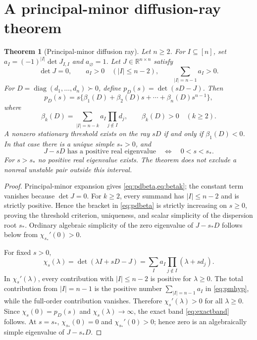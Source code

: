 \documentclass[11pt]{article}
\newtheorem{theorem}{Theorem}[section]
\theoremstyle{definition}
\newcommand{\R}{\mathbb R}
\newcommand{\diag}{\operatorname{diag}}
\newcommand{\1}{\mathbf 1}
\begin{document}
\section{A principal-minor diffusion-ray theorem}

\begin{theorem}[Principal-minor diffusion ray]\label{thm:diffusionray}
Let $n\ge2$.  For $I\subseteq[n]$, set
$a_I=(-1)^{|I|}\det J_{I,I}$ and
$a_\varnothing=1$.  Let $J\in\R^{n\times n}$ satisfy
\begin{equation}\label{eq:pmhyp}
 \det J=0,\qquad a_I>0\quad(|I|\le n-2),\qquad
 \sum_{|I|=n-1}a_I>0.
\end{equation}
For $D=\diag(d_1,\ldots,d_n)\succ0$, define $p_D(s)=\det(sD-J)$.  Then
\begin{equation}\label{eq:pdbeta}
 p_D(s)=s\{\beta_1(D)+\beta_2(D)s+\cdots+\beta_n(D)s^{n-1}\},
\end{equation}
where
\begin{equation}\label{eq:betak}
 \beta_k(D)=\sum_{|I|=n-k}a_I\prod_{j\notin I}d_j,
 \qquad \beta_k(D)>0\quad(k\ge2).
\end{equation}
A nonzero stationary threshold exists on the ray $sD$ if and only if
$\beta_1(D)<0$.  In that case there is a unique simple $s_*>0$, and
\begin{equation}\label{eq:exactband}
 J-sD\text{ has a positive real eigenvalue}
 \quad\Longleftrightarrow\quad 0<s<s_*.
\end{equation}
For $s>s_*$ no positive real eigenvalue exists.  The theorem does not exclude
a nonreal unstable pair outside this interval.
\end{theorem}

\begin{proof}
Principal-minor expansion gives \cref{eq:pdbeta,eq:betak}; the constant term
vanishes because $\det J=0$.  For $k\ge2$, every summand has
$|I|\le n-2$ and is strictly positive.  Hence the bracket in
\eqref{eq:pdbeta} is strictly increasing on $s\ge0$, proving the threshold
criterion, uniqueness, and scalar simplicity of the dispersion root $s_*$.  Ordinary
algebraic simplicity of the zero eigenvalue of $J-s_*D$ follows below from
$\chi_{s_*}'(0)>0$.

For fixed $s>0$,
\begin{equation}\label{eq:chis}
 \chi_s(\lambda)=\det(\lambda I+sD-J)
 =\sum_Ia_I\prod_{j\notin I}(\lambda+sd_j).
\end{equation}
In $\chi_s'(\lambda)$, every contribution with $|I|\le n-2$ is positive for
$\lambda\ge0$.  The total contribution from $|I|=n-1$ is the positive number
$\sum_{|I|=n-1}a_I$ in \eqref{eq:pmhyp}, while the full-order contribution
vanishes.  Therefore $\chi_s'(\lambda)>0$ for all $\lambda\ge0$.  Since
$\chi_s(0)=p_D(s)$ and $\chi_s(\lambda)\to\infty$, the exact band
\eqref{eq:exactband} follows.  At $s=s_*$,
$\chi_{s_*}(0)=0$ and $\chi_{s_*}'(0)>0$; hence zero is an algebraically
simple eigenvalue of $J-s_*D$.
\end{proof}
\end{document}
